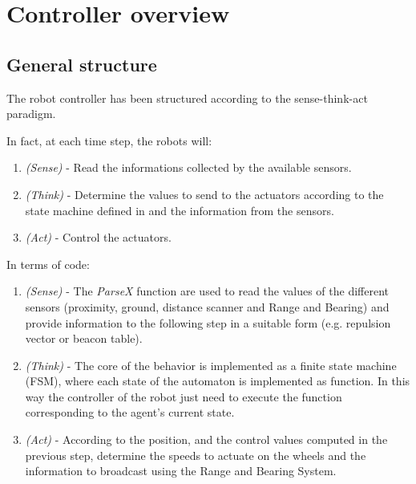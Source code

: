 \section{Controller overview}
\subsection{General structure}
The robot controller has been structured according to the sense-think-act paradigm.

In fact, at each time step, the robots will:
\begin{enumerate}
  \item \emph{(Sense)} - Read the informations collected by the available sensors.
  \item \emph{(Think)} - Determine the values to send to the actuators according to the state machine defined in  and the information from the sensors.
  \item \emph{(Act)} - Control the actuators.
\end{enumerate}

In terms of code:
\begin{enumerate}
  \item \emph{(Sense)} - The \emph{ParseX} function are used to read the values of the different sensors (proximity, ground, distance scanner and Range and Bearing) and provide information to the following step in a suitable form (e.g. repulsion vector or beacon table).
  \item \emph{(Think)} - The core of the behavior is implemented as a finite state machine (FSM), where each state of the automaton is implemented as function.
  In this way the controller of the robot just need to execute the function corresponding to the agent's current state.
  \item \emph{(Act)} - According to the position, and the control values computed in the previous step, determine the speeds to actuate on the wheels and the information to broadcast using 
  the Range and Bearing System.
\end{enumerate}

